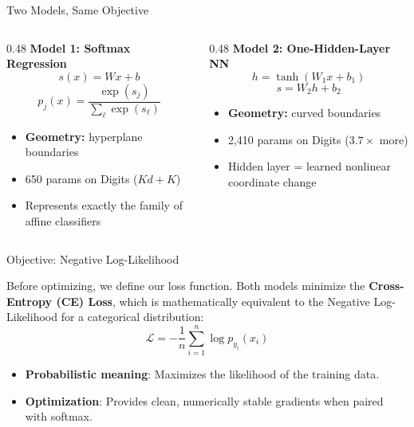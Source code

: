 \documentclass[11pt,aspectratio=169]{beamer}
\begin{document}
\begin{frame}{Two Models, Same Objective}

\begin{columns}[T]
\begin{column}{0.48\textwidth}
\textbf{Model 1: Softmax Regression}
\[
s(x) = Wx + b
\]
\[
p_j(x) = \frac{\exp(s_j)}{\sum_\ell \exp(s_\ell)}
\]
\begin{itemize}
    \item \textbf{Geometry:} hyperplane boundaries
    \item 650 params on Digits ($Kd + K$)
    \item Represents exactly the family of affine classifiers
\end{itemize}
\end{column}

\begin{column}{0.48\textwidth}
\textbf{Model 2: One-Hidden-Layer NN}
\[
h = \tanh(W_1 x + b_1)
\]
\[
s = W_2 h + b_2
\]
\begin{itemize}
    \item \textbf{Geometry:} curved boundaries
    \item 2{,}410 params on Digits ($3.7\times$ more)
    \item Hidden layer = learned nonlinear coordinate change
\end{itemize}
\end{column}
\end{columns}

\vspace{0.5em}
\end{frame}

\begin{frame}{Objective: Negative Log-Likelihood}

Before optimizing, we define our loss function. Both models minimize the \textbf{Cross-Entropy (CE) Loss}, which is mathematically equivalent to the Negative Log-Likelihood for a categorical distribution:
\[
\mathcal{L} = -\frac{1}{n} \sum_{i=1}^n \log p_{y_i}(x_i)
\]

\begin{itemize}
    \item \textbf{Probabilistic meaning}: Maximizes the likelihood of the training data.
    \item \textbf{Optimization}: Provides clean, numerically stable gradients when paired with softmax.
\end{itemize}

\end{frame}
\end{document}
